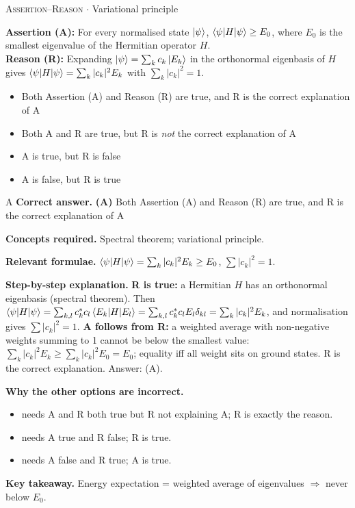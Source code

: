 \documentclass[11pt,a4paper]{article}
\newcommand{\optlabel}[1]{\textbf{(#1)}}
\newcommand{\correctlabel}[1]{\textcolor{okgreen}{\textbf{(#1)}\,\ding{51}}}
\newenvironment{qitem}[1]{\begin{list}{}{\setlength{\leftmargin}{3.3em}\setlength{\labelwidth}{3.1em}%
  \setlength{\labelsep}{0.2em}\setlength{\topsep}{3pt}\setlength{\parsep}{3pt}}\item[\textbf{Q.#1}\hfill]}{\end{list}}
\newcommand{\qsep}{\par\vspace{2pt}{\color{black!15}\hrule}\vspace{4pt}}
\newcommand{\qmeta}[2]{{\footnotesize\color{black!60}\textsc{#1} \;$\cdot$\; #2}\par}
\begin{document}
\begin{qitem}{7}
\qmeta{Assertion--Reason}{Variational principle}
\textbf{Assertion (A):} For every normalised state $\ket\psi$, $\braket{\psi|H|\psi} \ge E_0$, where $E_0$ is the smallest eigenvalue of the
Hermitian operator $H$.\\[1mm]
\textbf{Reason (R):} Expanding $\ket\psi = \sum_k c_k\ket{E_k}$ in the orthonormal eigenbasis of $H$ gives $\braket{\psi|H|\psi} = \sum_k |c_k|^2E_k$ with
$\sum_k|c_k|^2 = 1$.
\begin{itemize}[leftmargin=2.6em, labelsep=0.4em, itemsep=2pt, topsep=3pt]
\item[\correctlabel{A}] Both Assertion (A) and Reason (R) are true, and R is the correct explanation of A
\item[\optlabel{B}] Both A and R are true, but R is \emph{not} the correct explanation of A
\item[\optlabel{C}] A is true, but R is false
\item[\optlabel{D}] A is false, but R is true
\end{itemize}
\end{qitem}
\begin{solbox}{A}
\textbf{\color{brand}Correct answer.} \textcolor{okgreen}{\textbf{(A)}} Both Assertion (A) and Reason (R) are true, and R is the correct explanation of A

\textbf{\color{brand}Concepts required.} Spectral theorem; variational principle.

\textbf{\color{brand}Relevant formulae.} $\braket{\psi|H|\psi} = \sum_k|c_k|^2E_k \ge E_0$, $\sum|c_k|^2 = 1$.

\textbf{\color{brand}Step-by-step explanation.} \textbf{R is true:} a Hermitian $H$ has an orthonormal eigenbasis (spectral theorem). Then
$\braket{\psi|H|\psi} = \sum_{k,l} c_k^*c_l\braket{E_k|H|E_l} = \sum_{k,l}c_k^*c_lE_l\delta_{kl} = \sum_k|c_k|^2E_k$, and normalisation gives $\sum|c_k|^2 = 1$.
\textbf{A follows from R:} a weighted average with non-negative weights summing to 1 cannot be below the smallest value:
$\sum_k|c_k|^2E_k \ge \sum_k|c_k|^2E_0 = E_0$; equality iff all weight sits on ground states. R is the correct explanation. Answer: (A).

\textbf{\color{brand}Why the other options are incorrect.}
\begin{itemize}[leftmargin=2.4em, itemsep=1pt, topsep=2pt]
\item[\textbf{(B)}] needs A and R both true but R not explaining A; R is exactly the reason.
\item[\textbf{(C)}] needs A true and R false; R is true.
\item[\textbf{(D)}] needs A false and R true; A is true.
\end{itemize}
\textbf{\color{brand}Key takeaway.} Energy expectation = weighted average of eigenvalues $\Rightarrow$ never below $E_0$.
\end{solbox}
\qsep
\end{document}
